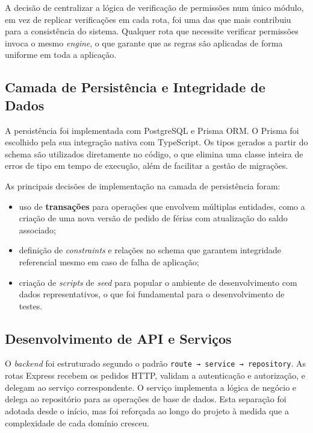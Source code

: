 \documentclass[12pt, a4paper, twoside, openright]{report}
\begin{document}
A decisão de centralizar a lógica de verificação de permissões num único módulo, em vez de replicar verificações em cada rota, foi uma das que mais contribuiu
para a consistência do sistema. Qualquer rota que necessite verificar permissões
invoca o mesmo \textit{engine}, o que garante que as regras são aplicadas de forma
uniforme em toda a aplicação.

\subsection{Camada de Persistência e Integridade de Dados}

A persistência foi implementada com PostgreSQL e Prisma ORM. O Prisma foi escolhido
pela sua integração nativa com TypeScript. Os tipos gerados a partir do schema
são utilizados diretamente no código, o que elimina uma classe inteira de erros de tipo
em tempo de execução, além de facilitar a gestão de migrações.

As principais decisões de implementação na camada de persistência foram:

\begin{itemize}
  \item uso de \textbf{transações} para operações que envolvem múltiplas entidades,
        como a criação de uma nova versão de pedido de férias com atualização do
        saldo associado;
  \item definição de \textit{constraints} e relações no schema que garantem integridade
        referencial mesmo em caso de falha de aplicação;
  \item criação de \textit{scripts} de \textit{seed} para popular o ambiente de
        desenvolvimento com dados representativos, o que foi fundamental para o
        desenvolvimento de testes.
\end{itemize}

\subsection{Desenvolvimento de API e Serviços}

O \textit{backend} foi estruturado segundo o padrão \texttt{route → service → repository}.
As rotas Express recebem os pedidos HTTP, validam a autenticação e autorização,
e delegam ao serviço correspondente. O serviço implementa a lógica de negócio
e delega ao repositório para as operações de base de dados. Esta separação foi
adotada desde o início, mas foi reforçada ao longo do projeto à medida que a
complexidade de cada domínio cresceu.
\end{document}
